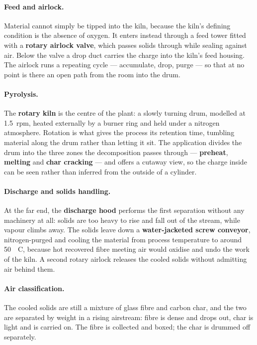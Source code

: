 \paragraph{Feed and airlock.}
Material cannot simply be tipped into the kiln, because the kiln's defining condition is the absence of oxygen. It enters instead through a feed tower fitted with a \textbf{rotary airlock valve}, which passes solids through while sealing against air. Below the valve a drop duct carries the charge into the kiln's feed housing. The airlock runs a repeating cycle --- accumulate, drop, purge --- so that at no point is there an open path from the room into the drum.

\paragraph{Pyrolysis.}
The \textbf{rotary kiln} is the centre of the plant: a slowly turning drum, modelled at \SI{1.5}{rpm}, heated externally by a burner ring and held under a nitrogen atmosphere. Rotation is what gives the process its retention time, tumbling material along the drum rather than letting it sit. The application divides the drum into the three zones the decomposition passes through --- \textbf{preheat}, \textbf{melting} and \textbf{char cracking} --- and offers a cutaway view, so the charge inside can be seen rather than inferred from the outside of a cylinder.

\paragraph{Discharge and solids handling.}
At the far end, the \textbf{discharge hood} performs the first separation
without any machinery at all: solids are too heavy to rise and fall out of the stream, while vapour climbs away. The solids leave down a \textbf{water-jacketed screw conveyor}, nitrogen-purged and cooling the
material from process temperature to around \SI{50}{\textdegree C}, because hot recovered fibre meeting air would oxidise and undo the work of the kiln. A second rotary airlock releases the cooled solids without admitting air behind them.

\paragraph{Air classification.}
The cooled solids are still a mixture of glass fibre and carbon char, and the two are separated by weight in a rising airstream: fibre is dense and drops out, char is light and is carried on. The fibre is collected and boxed; the char is drummed off separately.


